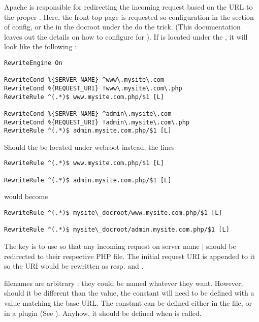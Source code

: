 \documentclass[pdftex,12pt,a4paper]{article}
\begin{document}
Apache is responsible for redirecting the incoming request based on the URL to the proper .
Here, the front top page is requested so configuration in the  section of  config, or the  in the docroot under the  do the trick. (This documentation leaves out the details on how to configure  for  ).
If  is located under the , it will look like the following :
\begin{lstlisting}[label=htaccess-sample,caption=.htaccess sample using mod\_rewrite]
RewriteEngine On

RewriteCond %{SERVER_NAME} ^www\.mysite\.com
RewriteCond %{REQUEST_URI} !www\.mysite\.com\.php
RewriteRule ^(.*)$ www.mysite.com.php/$1 [L]

RewriteCond %{SERVER_NAME} ^admin\.mysite\.com
RewriteCond %{REQUEST_URI} !admin\.mysite\.com\.php
RewriteRule ^(.*)$ admin.mysite.com.php/$1 [L]
\end{lstlisting}

Should the  be located under webroot instead, the lines
\begin{lstlisting}
RewriteRule ^(.*)$ www.mysite.com.php/$1 [L]

RewriteRule ^(.*)$ admin.mysite.com.php/$1 [L]
\end{lstlisting}
would become
\begin{lstlisting}
RewriteRule ^(.*)$ mysite\_docroot/www.mysite.com.php/$1 [L]

RewriteRule ^(.*)$ mysite\_docroot/admin.mysite.com.php/$1 [L]
\end{lstlisting}

The key is to use  so that any incoming request on server name  $|$  should be redirected to their respective PHP  file.
The initial request URI is appended to it so the URI  would be rewritten as resp.  and .\\
\begin{note}
 filenames are arbitrary : they could be named whatever they want. However, should it be different than the  value, the constant  will need to be defined with a value matching the base URL.
The constant can be defined either in the  file, or in a  plugin (See ). Anyhow, it should be defined when  is called.
\end{note}
\end{document}
